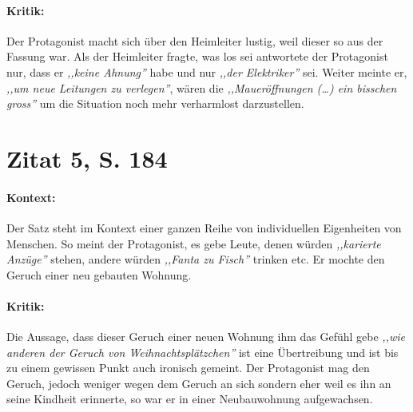 \documentclass[12pt,twoside,a4paper,twocolumn]{article}
\begin{document}
	\paragraph{Kritik:} Der Protagonist macht sich über den Heimleiter lustig, weil dieser so aus der Fassung war. Als der Heimleiter fragte, was los sei antwortete der Protagonist nur, dass er \textit{,,keine Ahnung''} habe und nur \textit{,,der Elektriker''} sei. Weiter meinte er, \textit{,,um neue Leitungen zu verlegen''}, wären die \textit{,,Maueröffnungen (\dots) ein bisschen gross''} um die Situation noch mehr verharmlost darzustellen.

	\section{Zitat 5, S. 184}
	
	\paragraph{Kontext:} Der Satz steht im Kontext einer ganzen Reihe von individuellen Eigenheiten von Menschen. So meint der Protagonist, es gebe Leute, denen würden \textit{,,karierte Anzüge''} stehen, andere würden \textit{,,Fanta zu Fisch''} trinken etc. Er mochte den Geruch einer neu gebauten Wohnung.
	
	\paragraph{Kritik:} Die Aussage, dass dieser Geruch einer neuen Wohnung ihm das Gefühl gebe \textit{,,wie anderen der Geruch von Weihnachtsplätzchen''} ist eine Übertreibung und ist bis zu einem gewissen Punkt auch ironisch gemeint. Der Protagonist mag den Geruch, jedoch weniger wegen dem Geruch an sich sondern eher weil es ihn an seine Kindheit erinnerte, so war er in einer Neubauwohnung aufgewachsen.
	
\end{document}
